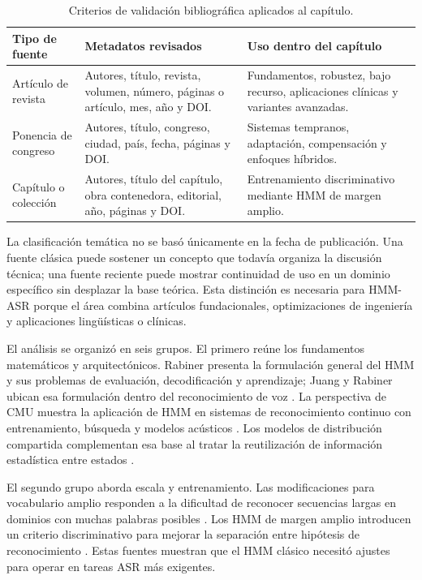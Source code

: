 \begin{table}[H]
\centering
\footnotesize
\setlength{\tabcolsep}{4pt}
\renewcommand{\arraystretch}{0.92}
\caption{Criterios de validación bibliográfica aplicados al capítulo.}
\label{tab:criterios_biblio}
\begin{tabular}{L{0.22\textwidth}L{0.33\textwidth}L{0.33\textwidth}}
\toprule
\textbf{Tipo de fuente} & \textbf{Metadatos revisados} & \textbf{Uso dentro del capítulo} \\
\midrule
Artículo de revista & Autores, título, revista, volumen, número, páginas o artículo, mes, año y DOI. & Fundamentos, robustez, bajo recurso, aplicaciones clínicas y variantes avanzadas. \\
Ponencia de congreso & Autores, título, congreso, ciudad, país, fecha, páginas y DOI. & Sistemas tempranos, adaptación, compensación y enfoques híbridos. \\
Capítulo o colección & Autores, título del capítulo, obra contenedora, editorial, año, páginas y DOI. & Entrenamiento discriminativo mediante HMM de margen amplio. \\
\bottomrule
\end{tabular}
\end{table}

La clasificación temática no se basó únicamente en la fecha de publicación. Una fuente clásica puede sostener un concepto que todavía organiza la discusión técnica; una fuente reciente puede mostrar continuidad de uso en un dominio específico sin desplazar la base teórica. Esta distinción es necesaria para HMM-ASR porque el área combina artículos fundacionales, optimizaciones de ingeniería y aplicaciones lingüísticas o clínicas.

El análisis se organizó en seis grupos. El primero reúne los fundamentos matemáticos y arquitectónicos. Rabiner presenta la formulación general del HMM y sus problemas de evaluación, decodificación y aprendizaje; Juang y Rabiner ubican esa formulación dentro del reconocimiento de voz \cite{Rabiner1989TutoriHidden,Juang1991HiddenMarkov}. La perspectiva de CMU muestra la aplicación de HMM en sistemas de reconocimiento continuo con entrenamiento, búsqueda y modelos acústicos \cite{Lee1990SpeechRecogn}. Los modelos de distribución compartida complementan esa base al tratar la reutilización de información estadística entre estados \cite{MeiYuhHwang1993SharedDistri}.

El segundo grupo aborda escala y entrenamiento. Las modificaciones para vocabulario amplio responden a la dificultad de reconocer secuencias largas en dominios con muchas palabras posibles \cite{ilingas2004SpecifHidden}. Los HMM de margen amplio introducen un criterio discriminativo para mejorar la separación entre hipótesis de reconocimiento \cite{Sha2007LargeMargin}. Estas fuentes muestran que el HMM clásico necesitó ajustes para operar en tareas ASR más exigentes.


